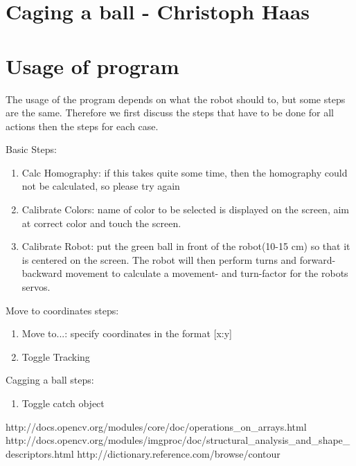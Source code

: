 \documentclass[703031]{iisreport}
\begin{document}
\section{Caging a ball - Christoph Haas}

\section{Usage of program}
The usage of the program depends on what the robot should to, but some steps are the same. Therefore we first discuss the steps that have to be done for all actions then the steps for each case.

Basic Steps:
	\begin{enumerate}
		\item Calc Homography: if this takes quite some time, then the homography could not be calculated, so please try again
		\item Calibrate Colors: name of color to be selected is displayed on the screen, aim at correct color and touch the screen.
		\item Calibrate Robot: put the green ball in front of the robot(10-15 cm) so that it is centered on the screen. The robot will then perform turns and forward-backward movement to calculate a movement- and turn-factor for the robots servos.
	\end{enumerate}
	
Move to coordinates steps:
	\begin{enumerate}
		\item Move to...: specify coordinates in the format [x:y]
		\item Toggle Tracking
	\end{enumerate}

Cagging a ball steps:
	\begin{enumerate}
		\item Toggle catch object
	\end{enumerate}

\small
\begin{thebibliography}{9}
		http://docs.opencv.org/modules/core/doc/operations\_on\_arrays.html	
		http://docs.opencv.org/modules/imgproc/doc/structural\_analysis\_and\_shape\_descriptors.html
		http://dictionary.reference.com/browse/contour
\end{thebibliography}
\end{document}
